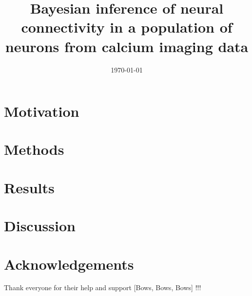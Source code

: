 \documentclass[dvips,aoas,preprint]{imsart}
\begin{document}

\date{\today}

\title{Bayesian inference of neural connectivity in a population of neurons from 
calcium imaging data}


\begin{abstract}

\end{abstract}

\maketitle

\section{Motivation}
\label{intro}


\section{Methods}
\label{sec:methods}



\section{Results}
\label{sec:results}


\section{Discussion}
\label{sec:discussion}


\section*{Acknowledgements}
Thank everyone for their help and support [Bows, Bows, Bows] !!!



\end{document}
